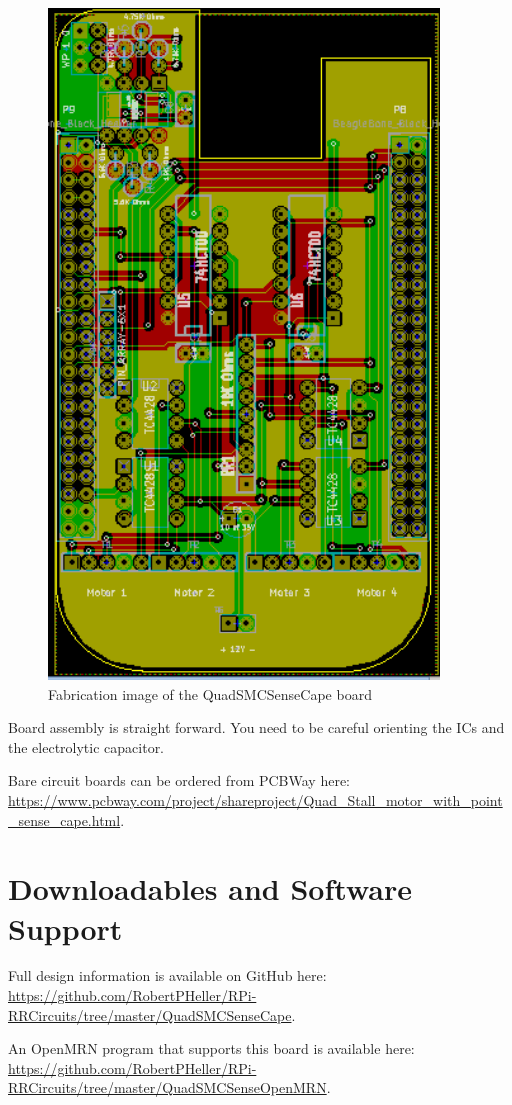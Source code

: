 \begin{figure}[hbpt]\begin{centering}%
\includegraphics[height=7in]{QuadSMCSenseCape.png}
\caption{Fabrication image of the QuadSMCSenseCape board}
\end{centering}\end{figure}
Board assembly is straight forward. You need to be careful orienting the ICs
and the electrolytic capacitor.

Bare circuit boards can be ordered from PCBWay here: 
\url{https://www.pcbway.com/project/shareproject/Quad_Stall_motor_with_point_sense_cape.html}.

\section{Downloadables and Software Support}

Full design information is available on GitHub here:
\url{https://github.com/RobertPHeller/RPi-RRCircuits/tree/master/QuadSMCSenseCape}.

An OpenMRN program that supports this board is available here:
\url{https://github.com/RobertPHeller/RPi-RRCircuits/tree/master/QuadSMCSenseOpenMRN}.




